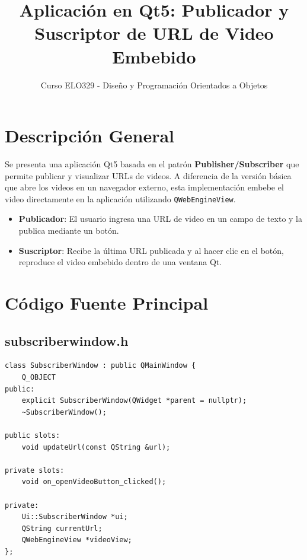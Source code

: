 \documentclass[12pt]{article}
\title{Aplicación en Qt5: Publicador y Suscriptor de URL de Video Embebido}
\author{Curso ELO329 - Diseño y Programación Orientados a Objetos}
\date{}
\begin{document}
\maketitle

\section*{Descripción General}

Se presenta una aplicación Qt5 basada en el patrón \textbf{Publisher/Subscriber} que permite publicar y visualizar URLs de videos. A diferencia de la versión básica que abre los videos en un navegador externo, esta implementación embebe el video directamente en la aplicación utilizando \texttt{QWebEngineView}.

\begin{itemize}
  \item \textbf{Publicador}: El usuario ingresa una URL de video en un campo de texto y la publica mediante un botón.
  \item \textbf{Suscriptor}: Recibe la última URL publicada y al hacer clic en el botón, reproduce el video embebido dentro de una ventana Qt.
\end{itemize}

\section*{Código Fuente Principal}

\subsection*{subscriberwindow.h}
\begin{lstlisting}
class SubscriberWindow : public QMainWindow {
    Q_OBJECT
public:
    explicit SubscriberWindow(QWidget *parent = nullptr);
    ~SubscriberWindow();

public slots:
    void updateUrl(const QString &url);

private slots:
    void on_openVideoButton_clicked();

private:
    Ui::SubscriberWindow *ui;
    QString currentUrl;
    QWebEngineView *videoView;
};
\end{lstlisting}
\end{document}
